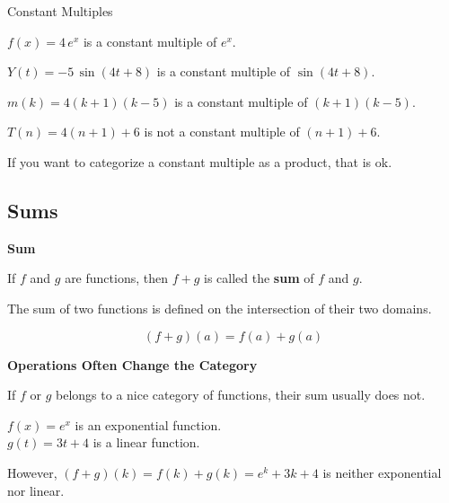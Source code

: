 \documentclass{ximera}
\begin{document}
\begin{example} Constant Multiples

$f(x) = 4 \, e^x$ is a constant multiple of $e^x$. 

$Y(t) = -5 \, \sin(4t + 8)$ is a constant multiple of $\sin(4t + 8)$. 

$m(k) = 4 (k+1)(k-5)$ is a constant multiple of $(k+1)(k-5)$. 


$T(n) = 4 (n+1) + 6$ is not a constant multiple of $(n+1) + 6$. 

\end{example}

If you want to categorize a constant multiple as a product, that is ok.
















\subsection*{Sums}


\begin{template}  \textbf{\textcolor{blue!55!black}{Sum}} 


If  $f$ and $g$ are functions, then $f + g$ is called the \textbf{\textcolor{blue!55!black}{sum}} of $f$ and $g$. 

The sum of two functions is defined on the intersection of their two domains. 


\[ (f + g)(a) = f(a) + g(a)  \]



\end{template}



\begin{warning} \textbf{\textcolor{red!70!black}{Operations Often Change the Category}}

If $f$ or $g$ belongs to a nice category of functions, their sum usually does not.

\end{warning}




\begin{example}

$f(x) = e^x$ is an exponential function. \\
$g(t) = 3 t + 4$ is a linear function. 

However, $(f + g)(k) = f(k) + g(k) = e^k + 3 k + 4$ is neither exponential nor linear.

\end{example}
\end{document}
